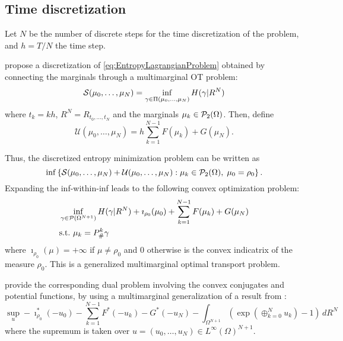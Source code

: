 \documentclass[../report.tex]{subfiles}
\begin{document}
\subsection{Time discretization}

Let $N$ be the number of discrete steps for the time discretization of the problem, and $h=T/N$ the time step.

\textcite{benamou2018entropy} propose a discretization of \eqref{eq:EntropyLagrangianProblem} obtained by connecting the marginals through a multimarginal OT problem:
\begin{equation}
\mathcal{S}(\mu_0,\ldots,\mu_N) =
\inf_{\gamma \in \Pi(\mu_0, \ldots, \mu_N)}
H(\gamma|R^N)
\end{equation}
where $t_k = kh$, $R^N = R_{t_0,\ldots,t_N}$ and the marginals $\mu_k \in \mathcal{P}_2(\Omega)$.
Then, define
\begin{equation}
\mathcal{U}(\mu_0,\ldots,\mu_N) = h\sum_{k=1}^{N-1} F(\mu_k) + G(\mu_N).
\end{equation}

Thus, the discretized entropy minimization problem can be written as
\[
\inf\left\{
\mathcal{S}(\mu_0, \ldots, \mu_N) +
\mathcal{U}(\mu_0, \ldots, \mu_N)
: \mu_k \in \mathcal{P}_2(\Omega),\; \mu_0 = \rho_0
\right\}.
\]
Expanding the inf-within-inf leads to the following convex optimization problem:
\begin{equation}
\begin{aligned}
&\inf_{\gamma \in \mathcal{P}(\Omega^{N+1})}
H(\gamma | R^N) + \imath_{\rho_0}(\mu_0) + \sum_{k=1}^{N-1} F(\mu_k) + G(\mu_N) \\
&\mathrm{s.t.}\ \mu_k = P^k_\#\gamma
\end{aligned}
\end{equation}
where $\imath_{\rho_0}(\mu) = +\infty$ if $\mu\neq \rho_0$ and $0$ otherwise is the convex indicatrix of the measure $\rho_0$. This is a generalized multimarginal optimal transport problem.

\textcite{benamou2018entropy} provide the corresponding dual problem involving the convex conjugates and potential functions, by using a multimarginal generalization of a result from \textcite{chizat2016scaling}:
\begin{equation}\label{eq:TimeDiscreteDual}
\sup_u -\imath_{\rho_0}^*(-u_0) - \sum_{k=1}^{N-1} F^*(-u_k) - G^*(-u_N)
- \int_{\Omega^{N+1}} \left(\exp\left(\oplus_{k=0}^N u_k\right)-1\right) \,dR^N
\end{equation}
where the supremum is taken over $u = (u_0,\ldots,u_N) \in L^\infty(\Omega)^{N+1}$.
\end{document}
